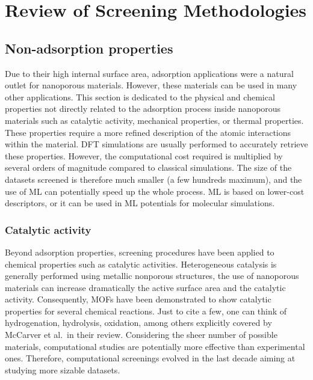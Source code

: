 \documentclass[main.tex]{subfiles}
\begin{document}
\section{Review of Screening Methodologies}


\subsection{Non-adsorption properties}

Due to their high internal surface area, adsorption applications were a natural outlet for nanoporous materials. However, these materials can be used in many other applications. This section is dedicated to the physical and chemical properties not directly related to the adsorption process inside nanoporous materials such as catalytic activity,\autocite{Singh_2015, Greeley_2006, Back_2020}
mechanical properties,\autocite{Chibani_2019, Gaillac_2020}
or thermal properties.\autocite{Toher_2014, Sarikurt_2020, Ducamp_2021} These properties require a more refined description of the atomic interactions within the material. DFT simulations are usually performed to accurately retrieve these properties. However, the computational cost required is multiplied by several orders of magnitude compared to classical simulations. The size of the datasets screened is therefore much smaller (a few hundreds maximum), and the use of ML can potentially speed up the whole process. ML is based on lower-cost descriptors,\autocite{Evans_2017, Ducamp_2022} or it can be used in ML potentials for molecular simulations\autocite{Eckhoff_2019,Friederich_2021}.

\subsubsection{Catalytic activity}

Beyond adsorption properties, screening procedures have been applied to chemical properties such as catalytic activities. Heterogeneous catalysis is generally performed using metallic nonporous structures, the use of nanoporous materials can increase dramatically the active surface area and the catalytic activity. Consequently, MOFs have been demonstrated to show catalytic properties for several chemical reactions. Just to cite a few, one can think of hydrogenation, hydrolysis, oxidation, among others explicitly covered by McCarver et al.\ in their review.\autocite{McCarver_2021}
Considering the sheer number of possible materials, computational studies are potentially more effective than experimental ones. Therefore, computational screenings evolved in the last decade aiming at studying more sizable datasets.
\end{document}
